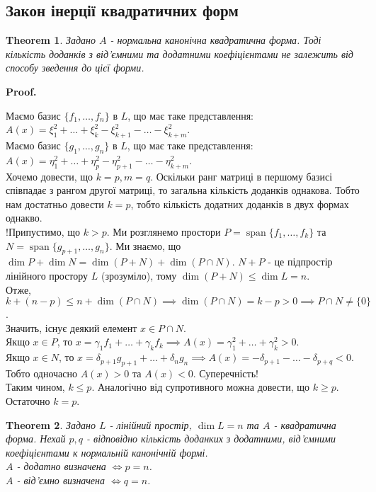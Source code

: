 \documentclass[a4paper, 10pt]{article}
\makeatletter
\theoremstyle{theoremdd}
\newtheorem{theorem}{Theorem}[subsection]
\DeclareMathOperator{\linspan}{span}
\renewenvironment{proof}[1][Proof.\\]{\par
\pushQED{\hfill \qed}%
\normalfont \topsep6\p@\@plus6\p@\relax
\trivlist
\item\relax
{\bfseries
#1\@addpunct{.}}\hspace\labelsep\ignorespaces
}{%
\popQED\endtrivlist\@endpefalse
}
\makeatother
\begin{document}
\subsection{Закон інерції квадратичних форм}
\begin{theorem}
Задано $A$ - нормальна канонічна квадратична форма. Тоді кількість доданків з від'ємними та додатними коефіцієнтами не залежить від способу зведення до цієї форми.
\end{theorem}

\begin{proof}
Маємо базис $\{f_1,\dots,f_n\}$ в $L$, що має таке представлення: $A(x) = \xi_1^2 + \dots + \xi_k^2 - \xi_{k+1}^2 - \dots - \xi_{k+m}^2$.\\
Маємо базис $\{g_1,\dots,g_n\}$ в $L$, що має таке представлення: $A(x) = \eta_1^2 + \dots + \eta_p^2 - \eta_{p+1}^2 - \dots - \eta_{k+m}^2$.\\
Хочемо довести, що $k=p, m=q$. Оскільки ранг матриці в першому базисі співпадає з рангом другої матриці, то загальна кількість доданків однакова. Тобто нам достатньо довести $k=p$, тобто кількість додатних доданків в двух формах однакво.\\
!Припустимо, що $k > p$. Ми розглянемо простори $P = \linspan\{f_1,\dots,f_k\}$ та $N = \linspan\{g_{p+1},\dots,g_n\}$. Ми знаємо, що $\dim P + \dim N = \dim (P+N) + \dim (P \cap N)$. $N+P$ - це підпростір лінійного простору $L$ (зрозуміло), тому $\dim (P+N) \leq \dim L = n$.\\
Отже, $k + (n-p) \leq n + \dim (P \cap N) \implies \dim (P \cap N) = k - p > 0 \implies P \cap N \neq \{0\}$.\\
Значить, існує деякий елемент $x \in P \cap N$. \\
Якщо $x \in P$, то $x = \gamma_1 f_1 + \dots + \gamma_k f_k \implies A(x) = \gamma_1^2 + \dots + \gamma_k^2 > 0$.\\
Якщо $x \in N$, то $x = \delta_{p+1} g_{p+1} + \dots + \delta_n g_n \implies A(x) = -\delta_{p+1} - \dots - \delta_{p+q} < 0$.\\
Тобто одночасно $A(x) > 0$ та $A(x) < 0$. Суперечність!\\
Таким чином, $k \leq p$. Аналогічно від супротивного можна довести, що $k \geq p$. Остаточно $k=p$. 
\end{proof}

\begin{theorem}
Задано $L$ - лінійний простір, $\dim L = n$ та $A$ - квадратична форма. Нехай $p,q$ - відповідно кількість доданких з додатними, від'ємними коефіцієнтами к нормальній канонічній формі.\\
$A$ - додатно визначена $\iff p = n$.\\
$A$ - від'ємно визначена $\iff q = n$.
\end{theorem}
\end{document}
